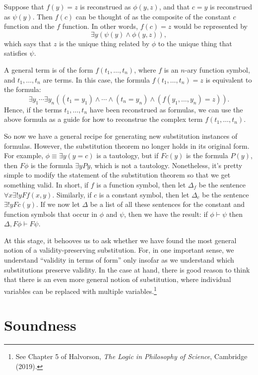 \begin{example} Suppose that $f(y)=z$ is reconstrued as $\phi (y,z)$,
  and that $c=y$ is reconstrued as $\psi (y)$.  Then $f(c)$ can be
  thought of as the composite of the constant $c$ function and the $f$
  function.  In other words, $f(c)=z$ would be represented by
  \[ \exists y\left( \psi (y)\wedge \phi (y,z) \right) ,\] which says
  that $z$ is the unique thing related by $\phi$ to the unique thing
  that satisfies $\psi$. 
\end{example}

A general term is of the form $f(t_1,\dots ,t_n)$, where $f$ is an
$n$-ary function symbol, and $t_1,\dots ,t_n$ are terms.  In this
case, the formula $f(t_1,\dots ,t_n)=z$ is equivalent to the formula:
\[ \exists y_1\cdots \exists y_n\left( (t_1=y_1)\wedge\cdots\wedge
    (t_n=y_n)\wedge (f(y_1,\dots ,y_n)=z) \right) .\] Hence, if the
terms $t_1,\dots ,t_n$ have been reconstrued as formulas, we can use
the above formula as a guide for how to reconstrue the complex term
$f(t_1,\dots ,t_n)$.

So now we have a general recipe for generating new substitution
instances of formulas.  However, the substitution theorem no longer
holds in its original form.  For example, $\phi\equiv \exists y(y=c)$
is a tautology, but if $Fc(y)$ is the formula $P(y)$, then $F\phi$ is
the formula $\exists yPy$, which is not a tautology.  Nonetheless,
it's pretty simple to modify the statement of the substitution theorem
so that we get something valid.  In short, if $f$ is a function
symbol, then let $\Delta _f$ be the sentence
$\forall x\exists !yFf(x,y)$.  Similarly, if $c$ is a constant symbol,
then let $\Delta _c$ be the sentence $\exists !yFc(y)$.  If we now let
$\Delta$ be a list of all these sentences for the constant and
function symbols that occur in $\phi$ and $\psi$, then we have the
result: if $\phi\vdash\psi$ then $\Delta ,F\phi\vdash F\psi$.

At this stage, it behooves us to ask whether we have found the most
general notion of a validity-preserving substitution.  For, in one
important sense, we understand ``validity in terms of form'' only
insofar as we understand which substitutions preserve validity.  In
the case at hand, there is good reason to think that there is an even
more general notion of substitution, where individual variables can be
replaced with multiple variables.\footnote{See Chapter 5 of Halvorson,
  \textit{The Logic in Philosophy of Science}, Cambridge (2019).}

\section{Soundness}

